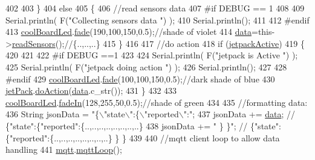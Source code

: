 \begin{DoxyCode}
402                 
403     \}   
404     \textcolor{keywordflow}{else}
405     \{
406         \textcolor{comment}{//read sensors data}
407 \textcolor{preprocessor}{    #if DEBUG == 1}
408 
409         Serial.println( F(\textcolor{stringliteral}{"Collecting sensors data "}) );
410         Serial.println();
411     
412 \textcolor{preprocessor}{    #endif}
413         \hyperlink{class_cool_board_a1b1d3c684a5baa56b08486e192fd8e97}{coolBoardLed}.\hyperlink{class_cool_board_led_af1cacbaa88db8bcf6042c1083ba41155}{fade}(190,100,150,0.5);\textcolor{comment}{//shade of violet        }
414         \hyperlink{class_cool_board_a427fb753dd8575bdf821c70a5c63d695}{data}=this->\hyperlink{class_cool_board_ad03abdce2e65f520bbf2cff0f2d083cf}{readSensors}();\textcolor{comment}{//\{..,..,..\}}
415     \}
416     
417     \textcolor{comment}{//do action}
418     \textcolor{keywordflow}{if} (\hyperlink{class_cool_board_a9be03a913d26e558328935ca3b59a75e}{jetpackActive})
419     \{
420 
421 
422 \textcolor{preprocessor}{    #if DEBUG ==1}
423 
424         Serial.println( F(\textcolor{stringliteral}{"jetpack is Active "}) );
425         Serial.println( F(\textcolor{stringliteral}{"jetpack doing action "}) );
426         Serial.println();
427 
428 \textcolor{preprocessor}{    #endif}
429         \hyperlink{class_cool_board_a1b1d3c684a5baa56b08486e192fd8e97}{coolBoardLed}.\hyperlink{class_cool_board_led_af1cacbaa88db8bcf6042c1083ba41155}{fade}(100,100,150,0.5);\textcolor{comment}{//dark shade of blue     }
430         \hyperlink{class_cool_board_a30b1357881b01ccbec676856a91e48e9}{jetPack}.\hyperlink{class_jetpack_a9e703197093094b963f9ad57817495b8}{doAction}(\hyperlink{class_cool_board_a427fb753dd8575bdf821c70a5c63d695}{data}.c\_str());
431     \}
432     
433     \hyperlink{class_cool_board_a1b1d3c684a5baa56b08486e192fd8e97}{coolBoardLed}.\hyperlink{class_cool_board_led_ab778f5e7bed0ab74e3906d82110493c3}{fadeIn}(128,255,50,0.5);\textcolor{comment}{//shade of green}
434 
435     \textcolor{comment}{//formatting data:}
436     String jsonData = \textcolor{stringliteral}{"\{\(\backslash\)"state\(\backslash\)":\{\(\backslash\)"reported\(\backslash\)":"};
437     jsonData += \hyperlink{class_cool_board_a427fb753dd8575bdf821c70a5c63d695}{data}; \textcolor{comment}{// \{"state":\{"reported":\{..,..,..,..,..,..,..,..\}}
438     jsonData += \textcolor{stringliteral}{" \} \}"}; \textcolor{comment}{// \{"state":\{"reported":\{..,..,..,..,..,..,..,..\}  \} \}}
439     
440     \textcolor{comment}{//mqtt client loop to allow data handling}
441     \hyperlink{class_cool_board_a2399f44d7c23c1149a335cb3b46d90f1}{mqtt}.\hyperlink{class_cool_m_q_t_t_aa5eaae967b562b62cbcf2b8d81f6e5d5}{mqttLoop}();

\end{DoxyCode}
